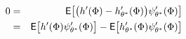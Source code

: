 \begin{equation}
\begin{aligned}
	0 & = & \Expect \bigl[\bigl(h'(\markovstate) - h'_{\param^*} (\markovstate)\bigr) \basis'_{\param^*} (\markovstate)\bigr]\\
	& = &  \Expect \bigl[ h'(\markovstate)\basis'_{\param^*} (\markovstate) \bigr] - \Expect \bigl[ h'_{\param^*} (\markovstate)\basis'_{\param^*} (\markovstate) \bigr]
\label{e:gradTD_nl}
\end{aligned}
\end{equation}

